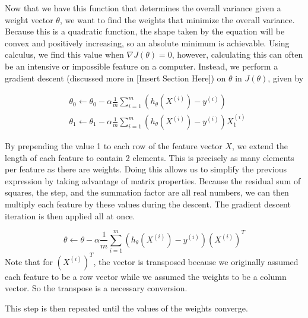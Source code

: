 \documentclass{book}[a5paper]
\newcommand{\placeholder}{[Insert Section Here]}
\begin{document}
Now that we have this function that determines the overall variance given a
weight vector $\theta$, we want to find the weights that minimize the overall
variance. Because this is a quadratic function, the shape taken by the equation
will be convex and positively increasing, so an absolute minimum is achievable.
Using calculus, we find this value when $\nabla J(\theta)=0$, however,
calculating this can often be an intensive or impossible feature on a computer.
Instead, we perform a gradient descent (discussed more in \placeholder) on
$\theta$ in $J(\theta)$, given by 

\begin{align*}
		&\theta_0 \leftarrow \theta_0 - \alpha \frac{1}{m}\sum_{i=1}^m(h_{\theta}(X^{(i)}) - y^{(i)})\\
		&\theta_1 \leftarrow \theta_1 - \alpha
        \frac{1}{m}\sum_{i=1}^m(h_{\theta}(X^{(i)}) - y^{(i)})X_1^{(i)}
\end{align*}

By prepending the value 1 to each row of the feature vector $X$, we extend the
length of each feature to contain 2 elements. This is precisely as many elements
per feature as there are weights. Doing this allows us to simplify the previous
expression by taking advantage of matrix properties. Because the residual sum of
squares, the step, and the summation factor are all real numbers, we can then
multiply each feature by these values during the descent. The gradient descent
iteration is then applied all at once.

\begin{equation}
    \theta \leftarrow \theta - \alpha
    \frac{1}{m}\sum_{i=1}^{m}(h_{\theta}(X^{(i)}) - y^{(i)})(X^{(i)})^T
\end{equation}
Note that for $(X^{(i)})^T$, the vector is transposed because we originally assumed
each feature to be a row vector while we assumed the weights to be a column
vector. So the transpose is a necessary conversion.

This step is then repeated until the values of the weights converge.  

\iffalse
\end{document}

